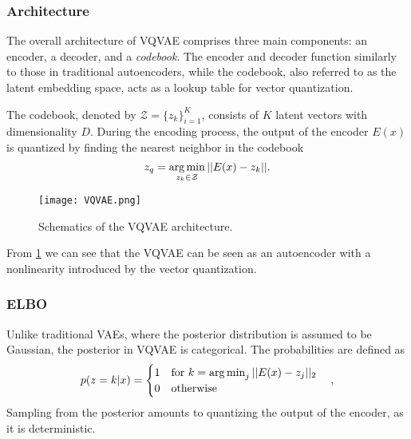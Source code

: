 \documentclass[../../thesis.tex]{subfiles}
\begin{document}


\subsubsection{Architecture}

The overall architecture of VQVAE comprises three main components: an encoder, a decoder, and a \textit{codebook}. The encoder and decoder function similarly to those in traditional autoencoders, while the codebook, also referred to as the latent embedding space, acts as a lookup table for vector quantization.\newline

The codebook, denoted by $\mathcal{Z} = \{z_k\}_{i=1}^K$, consists of $K$ latent vectors with dimensionality $D$. During the encoding process, the output of the encoder $E(x)$ is quantized by finding the nearest neighbor in the codebook
\begin{equation}
    z_q = \operatorname*{arg\,min}_{z_k\in\mathcal{Z}} ||E(x)-z_k||.
\end{equation}

\begin{figure}[h]
    \texttt{[image: VQVAE.png]}
    \centering
    \caption{Schematics of the VQVAE architecture.}
    \label{fig:VQVAE}
\end{figure}
From \ref{fig:VQVAE} we can see that the VQVAE can be seen as an autoencoder with a nonlinearity introduced by the vector quantization.

\subsubsection{ELBO}
Unlike traditional VAEs, where the posterior distribution is assumed to be Gaussian, the posterior in VQVAE is categorical. The probabilities are defined as
\begin{equation}
    p(z=k | x) = 
    \begin{cases} 
        1 \quad \text{for }k = \operatorname*{arg\,min}_j||E(x) - z_j||_2 \\
        0 \quad \text{otherwise}
    \end{cases},
\end{equation}
Sampling from the posterior amounts to quantizing the output of the encoder, as it is deterministic. \newline
\end{document}
